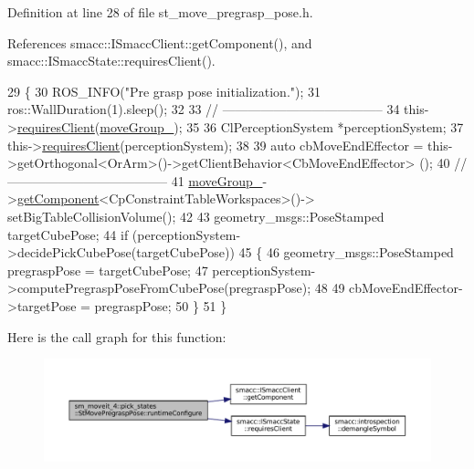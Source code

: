 Definition at line 28 of file st\+\_\+move\+\_\+pregrasp\+\_\+pose.\+h.



References smacc\+::\+I\+Smacc\+Client\+::get\+Component(), and smacc\+::\+I\+Smacc\+State\+::requires\+Client().


\begin{DoxyCode}
29             \{
30                 ROS\_INFO(\textcolor{stringliteral}{"Pre grasp pose initialization."});
31                 ros::WallDuration(1).sleep();
32 
33                 \textcolor{comment}{// --------------------------------------}
34                 this->\hyperlink{classsmacc_1_1ISmaccState_a7f95c9f0a6ea2d6f18d1aec0519de4ac}{requiresClient}(\hyperlink{structsm__moveit__4_1_1pick__states_1_1StMovePregraspPose_a7ac8229ab37dba1b2eb43668e4adceea}{moveGroup\_});
35                 
36                 ClPerceptionSystem *perceptionSystem;
37                 this->\hyperlink{classsmacc_1_1ISmaccState_a7f95c9f0a6ea2d6f18d1aec0519de4ac}{requiresClient}(perceptionSystem);
38 
39                 \textcolor{keyword}{auto} cbMoveEndEffector = this->getOrthogonal<OrArm>()->getClientBehavior<CbMoveEndEffector>
      ();
40                 \textcolor{comment}{// --------------------------------------}
41                 \hyperlink{structsm__moveit__4_1_1pick__states_1_1StMovePregraspPose_a7ac8229ab37dba1b2eb43668e4adceea}{moveGroup\_}->\hyperlink{classsmacc_1_1ISmaccClient_adef78db601749ca63c19e74a27cb88cc}{getComponent}<CpConstraintTableWorkspaces>()->
      setBigTableCollisionVolume();
42 
43                 geometry\_msgs::PoseStamped targetCubePose;
44                 \textcolor{keywordflow}{if} (perceptionSystem->decidePickCubePose(targetCubePose))
45                 \{
46                     geometry\_msgs::PoseStamped pregraspPose = targetCubePose;
47                     perceptionSystem->computePregraspPoseFromCubePose(pregraspPose);
48 
49                     cbMoveEndEffector->targetPose = pregraspPose;
50                 \}
51             \}
\end{DoxyCode}
Here is the call graph for this function\+:
\nopagebreak
\begin{figure}[H]
\begin{center}
\leavevmode
\includegraphics[width=350pt]{structsm__moveit__4_1_1pick__states_1_1StMovePregraspPose_ae9ffdf77d89169b5f4fb2cb2fadd56fc_cgraph}
\end{center}
\end{figure}
